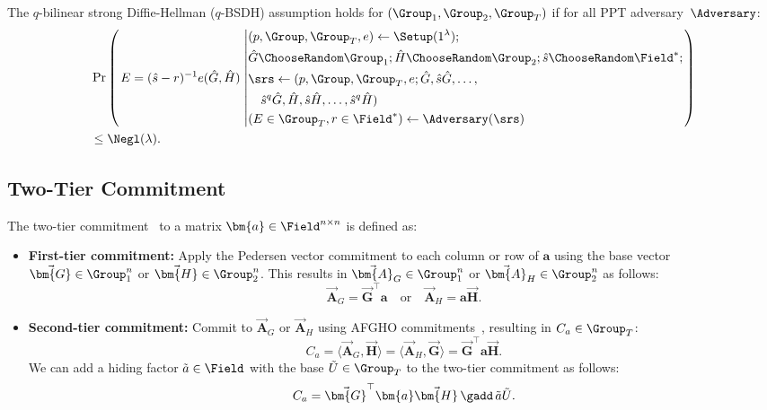 \begin{assumption}[$q$-BSDH]
	The $q$-bilinear strong Diffie-Hellman ($q$-BSDH) assumption holds for $(\Group_1, \Group_2, \Group_T)$ if for all PPT adversary~$\Adversary$:
	\begin{align}
		& \Pr
		\left(
			\left.
			\begin{aligned}
				& E = (\hat{s} - r)^{-1} e(\hat{G}, \hat{H}) \\ 
			\end{aligned}
			\right.
			\left|
			\begin{aligned}
				& (p, \Group, \Group_T, e) \leftarrow \Setup(1^{\lambda}); \\
				& \hat{G} \ChooseRandom \Group_1; \hat{H} \ChooseRandom \Group_2; \hat{s}\ChooseRandom \Field^*; \\
				& \srs \leftarrow (p,\Group, \Group_T, e; \hat{G}, \hat{s}\hat{G}, \ldots, \\
				& \quad \hat{s}^q \hat{G}, \hat{H}, \hat{s}\hat{H}, \ldots, \hat{s}^q \hat{H})\\
				& (E \in \Group_T, r \in \Field^*) \leftarrow \Adversary(\srs)
			\end{aligned}
			\right.
		\right)
		\nonumber \\
		& \le \Negl(\lambda) .
		\nonumber
	\end{align}
\end{assumption}

\subsection{Two-Tier Commitment}
\label{appx:twotier}
The two-tier commitment~\cite{asiacrypt/Groth11} to a matrix $\bm{a} \in \Field^{n \times n}$ is defined as:
\begin{itemize}
\item \textbf{First-tier commitment:}
Apply the Pedersen vector commitment to each column or row of $\bm{a}$ using the base vector $\vec{\bm{G}} \in \Group_1^n$ or $\vec{\bm{H}} \in \Group_2^n$.
This results in $\vec{\bm{A}}_G \in \Group_1^n$ or $\vec{\bm{A}}_H \in \Group_2^n$ as follows:
	\[
		\vec{\bm{A}}_G = \vec{\bm{G}}^\top\bm{a} \quad 
		\text{or} \quad
		\vec{\bm{A}}_H = \bm{a}\vec{\bm{H}}.
	\]
\item \textbf{Second-tier commitment:}
Commit to $\vec{\bm{A}}_G$ or $\vec{\bm{A}}_H$ using AFGHO commitments~\cite{crypto/AbeFGHO10}, resulting in $C_a \in \Group_T$:
	\[
		C_a = \langle \vec{\bm{A}}_G, \vec{\bm{H}} \rangle = \langle \vec{\bm{A}}_H, \vec{\bm{G}} \rangle 
		= \vec{\bm{G}}^\top\bm{a}\vec{\bm{H}}.
	\]
We can add a hiding factor $\tilde{a} \in \Field$ with the base $\tilde{U} \in \Group_T$ to the two-tier commitment as follows:
	\[
		C_a = \vec{\bm{G}}^\top\bm{a}\vec{\bm{H}} \, \gadd \, \tilde{a} \tilde{U}.
	\]
\end{itemize}

